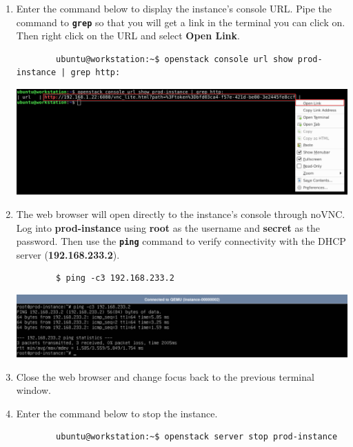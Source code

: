 \documentclass[letterpaper, 12pt]{article}
\begin{document}
\begin{enumerate}
    \item Enter the command below to display the instance's console URL. Pipe the command to \textbf{\texttt{grep}} so
    that you will get a link in the terminal you can click on. Then right click on the URL and select \textbf{Open
    Link}.
    \begin{lstlisting}
        ubuntu@workstation:~$ openstack console url show prod-instance | grep http:
    \end{lstlisting}

    \begin{center}
        \includegraphics[width=\linewidth]{images/part2/step15.png}
    \end{center}

    \item The web browser will open directly to the instance's console through noVNC. Log into \textbf{prod-instance}
    using \textbf{root} as the username and \textbf{secret} as the password. Then use the \textbf{\texttt{ping}}
    command to verify connectivity with the DHCP server (\textbf{192.168.233.2}).
    \begin{lstlisting}
        $ ping -c3 192.168.233.2
    \end{lstlisting}

    \begin{center}
        \includegraphics[width=\linewidth]{images/part2/step16.png}
    \end{center}

    \item Close the web browser and change focus back to the previous terminal window.
    
    \item Enter the command below to stop the instance.
    \begin{lstlisting}
        ubuntu@workstation:~$ openstack server stop prod-instance
    \end{lstlisting}


\end{enumerate}
\end{document}
